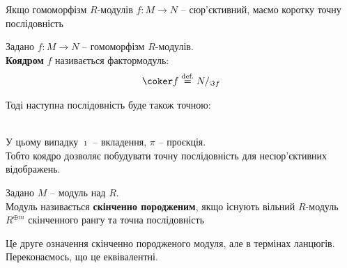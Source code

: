 \documentclass{math_library}
\begin{document}
Якщо гомоморфізм $R$-модулів $f \colon M \to N$ -- сюр'єктивний, маємо коротку точну послідовність 

\begin{definition}
Задано $f \colon M \to N$ -- гомоморфізм $R$-модулів.\\
\textbf{Коядром} $f$ називається фактормодуль:
\begin{align*}
\coker f \overset{\text{def.}}{=} N/_{\Im f}
\end{align*}
\end{definition}

Тоді наступна послідовність буде також точною: \\ \\
У цьому випадку $\imath$ -- вкладення, $\pi$ -- проєкція.\\
Тобто коядро дозволяє побудувати точну послідовність для несюр'єктивних відображень.

\begin{definition}
Задано $M$ -- модуль над $R$.\\
Модуль називається \textbf{скінченно породженим}, якщо існують вільний $R$-модуль $R^{\oplus m}$ скінченного рангу та точна послідовність
\begin{figure}[H]
\centering
{}
\end{figure}
\end{definition}

\begin{remark}
Це друге означення скінченно породженого модуля, але в термінах ланцюгів. Переконаємось, що це еквівалентні.
\end{remark}
\end{document}
